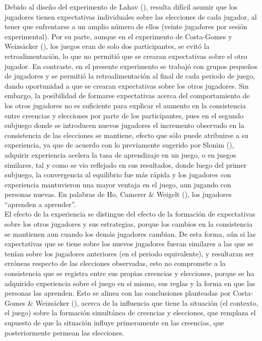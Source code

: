 Debido al diseño del experimento de Lahav (\citeyear{Lahav}), resulta difícil asumir que los jugadores tienen expectativas individuales sobre las elecciones de cada jugador, al tener que enfrentarse a un amplio número de ellos (veinte jugadores por sesión experimental). Por su parte, aunque en el experimento de Costa-Gomes y Weizsäcker (\citeyear{Costa-Gomes}), los juegos eran de solo dos participantes, se evitó la retroalimentación, lo que no permitió que se crearan expectativas sobre el otro jugador. En contraste, en el presente experimento se trabajó con grupos pequeños de jugadores y se permitió la retroalimentación al final de cada periodo de juego, dando oportunidad a que se crearan expectativas sobre los otros jugadores. Sin embargo, la  posibilidad de formarse expectativas acerca del comportamiento de los otros jugadores no es suficiente para explicar el aumento en la consistencia entre creencias y elecciones por parte de los participantes, pues en el segundo subjuego donde se introducen nuevos jugadores el incremento observado en la consistencia de las elecciones se mantiene, efecto que sólo puede atribuirse a su experiencia, ya que de acuerdo con lo previamente sugerido por Slonim (\citeyear{Slonim}), adquirir experiencia acelera la tasa de aprendizaje en un juego, o en juegos similares, tal y como se vio  reflejado en sus resultados, donde luego del primer subjuego, la convergencia al equilibrio fue más rápida y los jugadores con experiencia mantuvieron una mayor ventaja en el juego, aun jugando con personas nuevas. En palabras de Ho, Camerer & Weigelt (\citeyear{Ho}), los jugadores “aprenden a aprender”.\\

El efecto de la experiencia se distingue del efecto de la formación de expectativas sobre los otros jugadores y sus estrategias, porque los cambios en la consistencia se mantienen aun cuando los demás jugadores cambian. De esta forma, aún si las expectativas que se tiene sobre los nuevos jugadores fueran similares a las que se tenían sobre los jugadores anteriores (en el periodo equivalente), y resultaran ser erróneas respecto de las elecciones observadas, esto no compromete a la consistencia que se registra entre sus propias creencias y elecciones, porque se ha adquirido experiencia sobre el juego en sí mismo, sus reglas y la forma en que las personas las aprenden. Esto se alinea con las conclusiones planteadas por Costa-Gomes & Weizsäcker (\citeyear{Costa-Gomes}), acerca de la influencia que tiene la situación (el contexto, el juego) sobre la formación simultánea de creencias y elecciones, que remplaza el supuesto de que la situación influye primeramente en las creencias, que posteriormente permean las elecciones.\\


